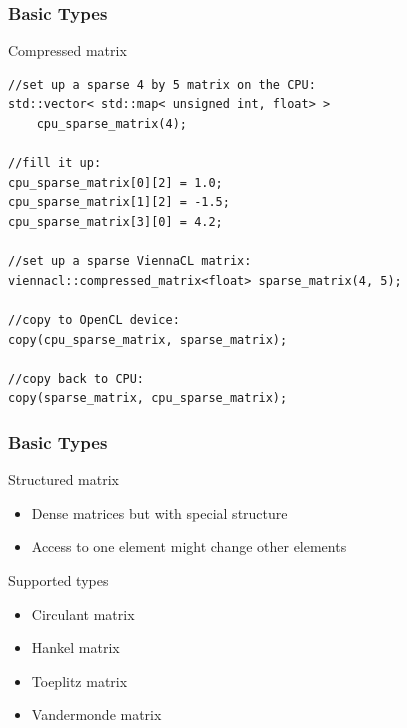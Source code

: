 \begin{frame}[fragile]
\frametitle{Basic Types}

\begin{block}{Compressed matrix}
  \begin{lstlisting}
//set up a sparse 4 by 5 matrix on the CPU:
std::vector< std::map< unsigned int, float> >
    cpu_sparse_matrix(4);

//fill it up:
cpu_sparse_matrix[0][2] = 1.0;
cpu_sparse_matrix[1][2] = -1.5;
cpu_sparse_matrix[3][0] = 4.2;

//set up a sparse ViennaCL matrix:
viennacl::compressed_matrix<float> sparse_matrix(4, 5);

//copy to OpenCL device:
copy(cpu_sparse_matrix, sparse_matrix);

//copy back to CPU:
copy(sparse_matrix, cpu_sparse_matrix);
  \end{lstlisting}
\end{block}

\end{frame}





\begin{frame}
\frametitle{Basic Types}

\begin{block}{Structured matrix}
  \begin{itemize}
   \item Dense matrices but with special structure
   \item Access to one element might change other elements
  \end{itemize}
\end{block}

\begin{block}{Supported types}
  \begin{itemize}
   \item Circulant matrix
   \item Hankel matrix
   \item Toeplitz matrix
   \item Vandermonde matrix
  \end{itemize}
\end{block}

\end{frame}


